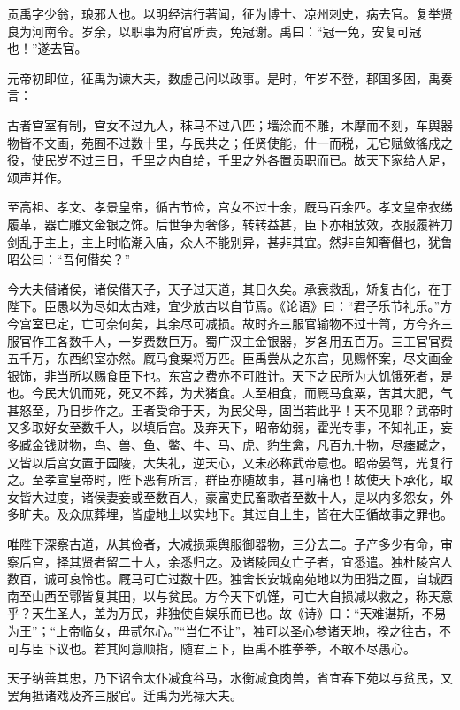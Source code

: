 \documentclass[]{article}
\begin{document}
贡禹字少翁，琅邪人也。以明经洁行著闻，征为博士、凉州刺史，病去官。复举贤良为河南令。岁余，以职事为府官所责，免冠谢。禹曰：``冠一免，安复可冠也！''遂去官。

元帝初即位，征禹为谏大夫，数虚己问以政事。是时，年岁不登，郡国多困，禹奏言：

古者宫室有制，宫女不过九人，秣马不过八匹；墙涂而不雕，木摩而不刻，车舆器物皆不文画，苑囿不过数十里，与民共之；任贤使能，什一而税，无它赋敛徭戍之役，使民岁不过三日，千里之内自给，千里之外各置贡职而已。故天下家给人足，颂声并作。

至高祖、孝文、孝景皇帝，循古节俭，宫女不过十余，厩马百余匹。孝文皇帝衣绨履革，器亡雕文金银之饰。后世争为奢侈，转转益甚，臣下亦相放效，衣服履裤刀剑乱于主上，主上时临潮入庙，众人不能别异，甚非其宜。然非自知奢僣也，犹鲁昭公曰：``吾何僣矣？''

今大夫僣诸侯，诸侯僣天子，天子过天道，其日久矣。承衰救乱，矫复古化，在于陛下。臣愚以为尽如太古难，宜少放古以自节焉。《论语》曰：``君子乐节礼乐。''方今宫室已定，亡可奈何矣，其余尽可减损。故时齐三服官输物不过十笥，方今齐三服官作工各数千人，一岁费数巨万。蜀广汉主金银器，岁各用五百万。三工官官费五千万，东西织室亦然。厩马食粟将万匹。臣禹尝从之东宫，见赐怀案，尽文画金银饰，非当所以赐食臣下也。东宫之费亦不可胜计。天下之民所为大饥饿死者，是也。今民大饥而死，死又不葬，为犬猪食。人至相食，而厩马食粟，苦其大肥，气甚怒至，乃日步作之。王者受命于天，为民父母，固当若此乎！天不见耶？武帝时又多取好女至数千人，以填后宫。及弃天下，昭帝幼弱，霍光专事，不知礼正，妄多臧金钱财物，鸟、兽、鱼、鳖、牛、马、虎、豹生禽，凡百九十物，尽瘗臧之，又皆以后宫女置于园陵，大失礼，逆天心，又未必称武帝意也。昭帝晏驾，光复行之。至孝宣皇帝时，陛下恶有所言，群臣亦随故事，甚可痛也！故使天下承化，取女皆大过度，诸侯妻妾或至数百人，豪富吏民畜歌者至数十人，是以内多怨女，外多旷夫。及众庶葬埋，皆虚地上以实地下。其过自上生，皆在大臣循故事之罪也。

唯陛下深察古道，从其俭者，大减损乘舆服御器物，三分去二。子产多少有命，审察后宫，择其贤者留二十人，余悉归之。及诸陵园女亡子者，宜悉遣。独杜陵宫人数百，诚可哀怜也。厩马可亡过数十匹。独舍长安城南苑地以为田猎之囿，自城西南至山西至鄠皆复其田，以与贫民。方今天下饥馑，可亡大自损减以救之，称天意乎？天生圣人，盖为万民，非独使自娱乐而已也。故《诗》曰：``天难谌斯，不易为王''；``上帝临女，毋贰尔心。''``当仁不让''，独可以圣心参诸天地，揆之往古，不可与臣下议也。若其阿意顺指，随君上下，臣禹不胜拳拳，不敢不尽愚心。

天子纳善其忠，乃下诏令太仆减食谷马，水衡减食肉兽，省宜春下苑以与贫民，又罢角抵诸戏及齐三服官。迁禹为光禄大夫。
\end{document}
